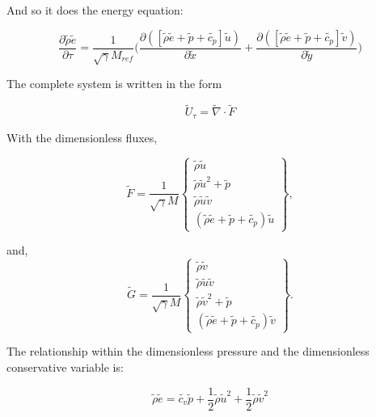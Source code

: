 \documentclass[10pt,a4paper]{article}
\begin{document}
And so it does the energy equation:

\begin{equation}
\frac{\partial \tilde{\rho}\tilde{e}}{\partial \tau} = \frac{1}{\sqrt{\gamma}M_{ref}}\biggl( \frac{\partial ([\tilde{\rho}\tilde{e} + \tilde{p}+\tilde{c_p}]\tilde{u}) }{\partial \tilde{x}}+\frac{\partial ([\tilde{\rho}\tilde{e} + \tilde{p}+\tilde{c_p}]\tilde{v})  }{\partial \tilde{y}}\biggr)
\end{equation}


The complete system is written in the form

\begin{equation}
\tilde{U}_\tau = \tilde{\nabla}\cdot \tilde{F}	
\end{equation}

With the dimensionless fluxes,

\begin{equation}
\tilde{F} =\frac{1}{\sqrt{\gamma}M}\left\{\begin{array}{c} \tilde{\rho}\tilde{u} \\ \tilde{\rho}\tilde{u}^2 + \tilde{p} \\ \tilde{\rho}\tilde{u}\tilde{v} \\ (\tilde{\rho}\tilde{e} + \tilde{p} + \tilde{c_p})\tilde{u}\end{array}\right\},
\end{equation}

and, 
\begin{equation}
\tilde{G} =\frac{1}{\sqrt{\gamma}M}\left\{\begin{array}{c} \tilde{\rho}\tilde{v} \\\tilde{\rho}\tilde{u}\tilde{v} \\ \tilde{\rho}\tilde{v}^2 + \tilde{p}  \\ (\tilde{\rho}\tilde{e} + \tilde{p} + \tilde{c_p})\tilde{v}\end{array}\right\}.
\end{equation}

The relationship within the dimensionless pressure and the dimensionless conservative variable is:

\begin{equation}
\tilde{\rho}\tilde{e} = \tilde{c_v} \tilde{p} + \frac{1}{2}\tilde{\rho}\tilde{u}^2 + \frac{1}{2}\tilde{\rho}\tilde{v}^2	
\end{equation}
\end{document}
